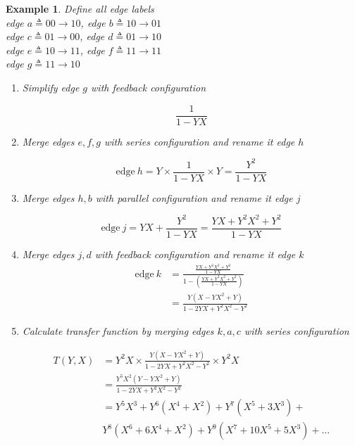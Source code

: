 \documentclass[conference]{IEEEtran}
\newtheorem{example}[theorem]{Example}
\begin{document}
\begin{example} Define all edge labels\\
\label{ex3}
 edge $ a\triangleq 0 0 \rightarrow 1 0$,  edge $b \triangleq 1 0 \rightarrow 0 1$\\
 edge $ c \triangleq 0 1 \rightarrow 0 0$, edge $d \triangleq 0 1 \rightarrow 1 0$\\
 edge $ e \triangleq 1 0 \rightarrow 1 1$, edge $f \triangleq 1 1 \rightarrow 1 1$\\
 edge $ g \triangleq 1 1 \rightarrow 1 0$

\begin{enumerate}
\item Simplify edge $g$ with feedback configuration

$$ \frac{1}{1-YX}$$

\item Merge edges $e,f,g$ with series configuration and rename it edge $h$

$$\text{edge}~h = Y\times \frac{1}{1-YX}\times Y=\frac{Y^2}{1-YX}$$

\item Merge edges $h,b$ with parallel configuration and rename it edge $j$

$$\text{edge}~j = YX+ \frac{Y^2}{1-YX}= \frac{YX+Y^2X^2+Y^2}{1-YX}$$

\item Merge  edges $j,d$ with feedback configuration and rename it edge $k$ 
\begin{equation*}
\begin{split}
 \text{edge}~k&= \frac{\frac{YX+Y^2X^2+Y^2}{1-YX}}{1-(\frac{YX+Y^2X^2+Y^2}{1-YX})}\\
 &=\frac{Y(X-YX^2+Y)}{1-2YX+Y^2X^2-Y^2}
\end{split}
\end{equation*}

\item Calculate transfer function by merging edges $k,a,c$ with series configuration

\begin{equation*}
\begin{split}
T(Y,X)&=Y^2X \times \frac{Y(X-YX^2+Y)}{1-2YX+Y^2X^2-Y^2}\times Y^2X \\
&=\frac{Y^5X^2(Y-YX^2+Y)}{1-2YX+Y^2X^2-Y^2}\\
&=Y^5X^3+Y^6(X^4+X^2)+Y^7(X^5+3X^3)+\\
&Y^8(X^6+6X^4+X^2)+Y^9(X^7+10X^5+5X^3)+...
\end{split}
\end{equation*}
\end{enumerate}
\end{example}
\end{document}
